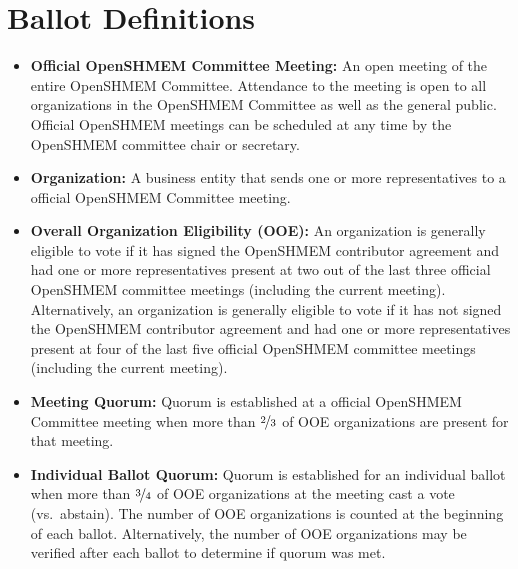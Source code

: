 \section{Ballot Definitions}

\begin{itemize}
\item {\bf Official OpenSHMEM Committee Meeting:} An open meeting of the entire
  OpenSHMEM Committee.  Attendance to the meeting is open to
  all organizations in the OpenSHMEM Committee as well as the general public.
  Official OpenSHMEM meetings can be scheduled at any time by the OpenSHMEM
  committee chair or secretary.

\item {\bf Organization:} A business entity that sends one or more
  representatives to a official OpenSHMEM Committee meeting.

\item {\bf Overall Organization Eligibility (OOE):} An organization is
  generally eligible to vote if it
  has signed the OpenSHMEM contributor agreement and had one or more
  representatives present at two out of the last three
  official OpenSHMEM committee meetings (including the current meeting).
  Alternatively, an organization is generally eligible to vote if it has not
  signed the OpenSHMEM contributor agreement and had one or more
  representatives present at four of the last five official OpenSHMEM committee
  meetings (including the current meeting).

\item {\bf Meeting Quorum:} Quorum is established at a official OpenSHMEM
  Committee meeting when more than $\nicefrac{2}{3}$ of OOE organizations
  are present for that meeting.

\item {\bf Individual Ballot Quorum:} Quorum is established for an
  individual ballot when more than $\nicefrac{3}{4}$ of OOE
  organizations at the meeting cast a vote (vs.\ abstain).  The number
  of OOE organizations is counted at the beginning of each ballot.
  Alternatively, the number of OOE organizations may be verified after
  each ballot to determine if quorum was met.
\end{itemize}
